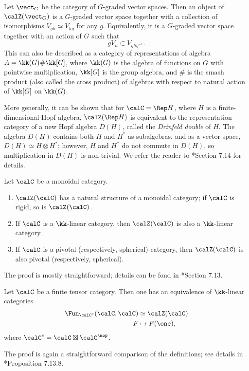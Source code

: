 \begin{example}\label{x:center-vectg}
  Let $\vect_G$ be the category of $G$-graded vector spaces. Then an object
  of $\calZ(\vect_G)$ is a $G$-graded vector space together with a collection
  of isomorphisms $V_{gh}\simeq V_{hg}$ for any $g$. Equivalently, it is a
  $G$-graded vector space together with an action of $G$ such that
  $$
   gV_h\subset V_{ghg^{-1}}.
  $$
  This can also be described as a category of representations of algebra
  $A=\kk(G)\# \kk[G]$, where $\kk(G)$ is the algebra of functions on $G$
  with pointwise multiplication, $\kk[G]$ is the group algebra, and $\#$ is
  the smash product (also called the cross product) of algebras with
  respect to natural action of $\kk[G]$ on $\kk(G)$.
\end{example}
More generally, it can be shown that for $\calC=\Rep H$, where $H$ is a
finite-dimensional Hopf algebra, $\calZ(\Rep H)$ is equivalent to the
representation category of a new Hopf algebra $D(H)$, called the \emph{Drinfeld
double} of $H$. The algebra $D(H)$ contains both $H$ and
$H^*$ as subalgebras, and as a vector space, $D(H)\simeq H\otimes H^*$; however,
$H$ and $H^*$ do not commute in $D(H)$, so multiplication in $D(H)$ is
non-trivial. We refer the reader to *{Section 7.14} for
details.

\begin{lemma}\label{l:drinfeld-monoidal}
  Let $\calC$ be a monoidal category.
  \begin{enumerate}
    \item $\calZ(\calC)$ has a natural structure of a monoidal category; if
      $\calC$ is rigid, so is $\calZ(\calC)$.
    \item If $\calC$ is a $\kk$-linear category, then $\calZ(\calC)$ is also
      a $\kk$-linear category.
    \item If $\calC$ is a pivotal \textup{(}respectively, spherical\textup{)} category, then
      $\calZ(\calC)$ is also pivotal \textup{(}respectively, spherical\textup{)}.
  \end{enumerate}
\end{lemma}
The proof is mostly straightforward; details can be fond in
*{Section 7.13}.

\begin{lemma}\label{l:dr-center-2}
  Let $\calC$ be a finite tensor category. Then one has an equivalence of
  $\kk$-linear categories
  \begin{align*}
    \Fun_{\calC^e}(\calC, \calC)&\simeq \calZ(\calC)\\
                              F&\mapsto F(\one),
  \end{align*}
  where $\calC^e=\calC\boxtimes\calC^{\mop}$.
\end{lemma}
The proof is again a straightforward comparison of the definitions; see details
in  *{Proposition 7.13.8}.


